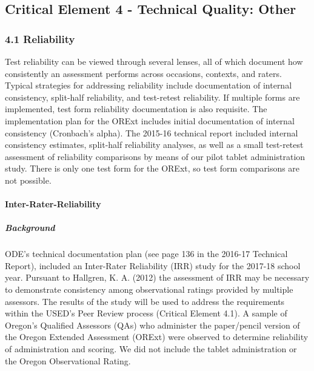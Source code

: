 \documentclass[]{article}
\title{}
\author{}
\date{}
\let\oldparagraph\paragraph
\renewcommand{\paragraph}[1]{\oldparagraph{#1}\mbox{}}
\let\oldsubparagraph\subparagraph
\renewcommand{\subparagraph}[1]{\oldsubparagraph{#1}\mbox{}}
\begin{document}
{
\setcounter{tocdepth}{5}
\tableofcontents
}
\hypertarget{critical-element-4---technical-quality-other}{%
\subsection{Critical Element 4 - Technical Quality:
Other}\label{critical-element-4---technical-quality-other}}

\hypertarget{reliability}{%
\subsubsection{4.1 Reliability}\label{reliability}}

Test reliability can be viewed through several lenses, all of which
document how consistently an assessment performs across occasions,
contexts, and raters. Typical strategies for addressing reliability
include documentation of internal consistency, split-half reliability,
and test-retest reliability. If multiple forms are implemented, test
form reliability documentation is also requisite. The implementation
plan for the ORExt includes initial documentation of internal
consistency (Cronbach's alpha). The 2015-16 technical report included
internal consistency estimates, split-half reliability analyses, as well
as a small test-retest assessment of reliability comparisons by means of
our pilot tablet administration study. There is only one test form for
the ORExt, so test form comparisons are not possible.

\hypertarget{inter-rater-reliability}{%
\paragraph{Inter-Rater-Reliability}\label{inter-rater-reliability}}

\hypertarget{background}{%
\subparagraph{Background}\label{background}}

ODE's technical documentation plan (see page 136 in the 2016-17
Technical Report), included an Inter-Rater Reliability (IRR) study for
the 2017-18 school year. Pursuant to Hallgren, K. A. (2012) the
assessment of IRR may be necessary to demonstrate consistency among
observational ratings provided by multiple assessors. The results of the
study will be used to address the requirements within the USED's Peer
Review process (Critical Element 4.1). A sample of Oregon's Qualified
Assessors (QAs) who administer the paper/pencil version of the Oregon
Extended Assessment (ORExt) were observed to determine reliability of
administration and scoring. We did not include the tablet administration
or the Oregon Observational Rating.
\end{document}
